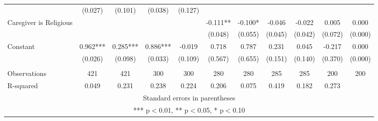 \begin{tabular}{lcccccccccc}
 & (0.027) & (0.101) & (0.038) & (0.127) &  &  &  &  &  &  \\
Caregiver is Religious &  &  &  &  & -0.111** & -0.100* & -0.046 & -0.022 & 0.005 & 0.000 \\
 &  &  &  &  & (0.048) & (0.055) & (0.045) & (0.042) & (0.072) & (0.000) \\
Constant & 0.962*** & 0.285*** & 0.886*** & -0.019 & 0.718 & 0.787 & 0.231 & 0.045 & -0.217 & 0.000 \\
 & (0.026) & (0.098) & (0.033) & (0.109) & (0.567) & (0.655) & (0.151) & (0.140) & (0.370) & (0.000) \\
 &  &  &  &  &  &  &  &  &  &  \\
Observations & 421 & 421 & 300 & 300 & 280 & 280 & 285 & 285 & 200 & 200 \\
 R-squared & 0.049 & 0.231 & 0.238 & 0.224 & 0.206 & 0.075 & 0.419 & 0.182 & 0.273 &  \\ \hline
\multicolumn{11}{c}{ Standard errors in parentheses} \\
\multicolumn{11}{c}{ *** p$<$0.01, ** p$<$0.05, * p$<$0.10} \\
\end{tabular}
